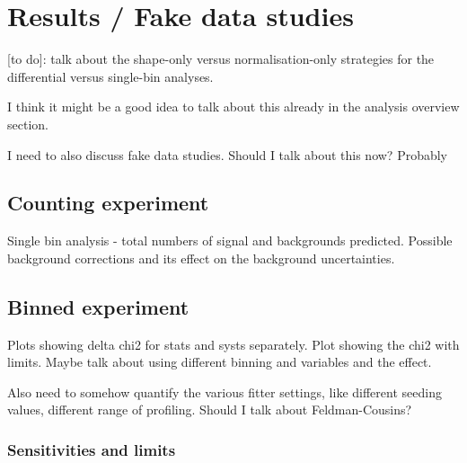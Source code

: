 \section{Results / Fake data studies}
[to do]: talk about the shape-only versus normalisation-only strategies for the differential versus single-bin analyses.

I think it might be a good idea to talk about this already in the analysis overview section.

I need to also discuss fake data studies. Should I talk about this now? Probably

\subsection{Counting experiment}
Single bin analysis - total numbers of signal and backgrounds predicted. Possible background corrections and its effect on the background uncertainties. 

\subsection{Binned experiment}
Plots showing delta chi2 for stats and systs separately. Plot showing the chi2 with limits. Maybe talk about using different binning and variables and the effect.

Also need to somehow quantify the various fitter settings, like different seeding values, different range of profiling. Should I talk about Feldman-Cousins? 

\subsubsection{Sensitivities and limits}
